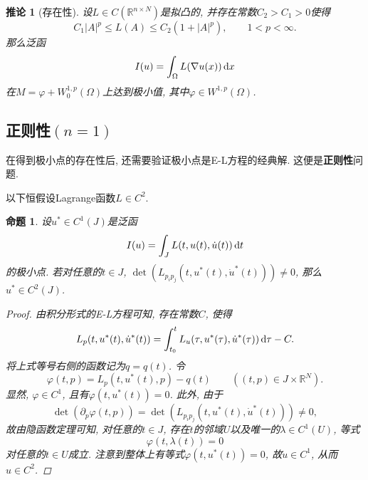 \documentclass[12pt,a4paper]{article}
\newtheorem{proposition}[theorem]{命题}
\newtheorem{corollary}[theorem]{推论}
\begin{document}
\begin{corollary}[存在性]
    设$L \in C(\mathbb{R}^{n \times N})$是拟凸的, 并存在常数$C_2 > C_1 > 0$使得 
    \begin{equation*}
        C_1|A|^p \leq L(A) \leq C_2(1 + |A|^p), \qquad 1 < p < \infty.
    \end{equation*}
    那么泛函 
    \begin{equation*}
        I(u) = \int_{\Omega}L(\nabla u(x)) \,{\rm d}x
    \end{equation*}
    在$M = \varphi + W_0^{1, p}(\Omega)$上达到极小值, 其中$\varphi \in W^{1, p}(\Omega)$.
\end{corollary}

\subsection{正则性\texorpdfstring{$(n = 1)$}{}}

在得到极小点的存在性后, 还需要验证极小点是E-L方程的经典解. 这便是\textbf{正则性}问题.

以下恒假设Lagrange函数$L \in C^2$.

\begin{proposition}
    设$u^* \in C^1(J)$是泛函 
    \begin{equation*}
        I(u) = \int_JL(t, u(t), \dot u(t)) \,{\rm d}t
    \end{equation*}
    的极小点. 若对任意的$t \in J$, $\det(L_{p_ip_j}(t, u^*(t), \dot u^*(t))) \neq 0$, 那么$u^* \in C^2(J)$.
    \begin{proof}
        由积分形式的E-L方程可知, 存在常数$C$, 使得 
        \begin{equation*}
            L_p(t, u^*(t), \dot u^*(t)) = \int_{t_0}^tL_u(\tau, u^*(\tau), \dot u^*(\tau)) \,{\rm d}\tau - C.
        \end{equation*} 
        将上式等号右侧的函数记为$q = q(t)$. 令
        \begin{equation*}
            \varphi(t, p) = L_p(t, u^*(t), p) - q(t) \qquad ((t, p) \in J \times \mathbb{R}^N).
        \end{equation*}
        显然, $\varphi \in C^1$, 且有$\varphi(t, u^*(t)) = 0$. 此外, 由于
        \begin{equation*}
            \det(\partial_p\varphi(t, p)) = \det(L_{p_ip_j}(t, u^*(t), \dot u^*(t))) \neq 0,
        \end{equation*} 
        故由隐函数定理可知, 对任意的$t \in J$, 存在$t$的邻域$U$以及唯一的$\lambda \in C^1(U)$, 等式 
        \begin{equation*}
            \varphi(t, \lambda(t)) = 0
        \end{equation*}
        对任意的$t \in U$成立. 注意到整体上有等式$\varphi(t, u^*(t)) = 0$, 故$\dot u \in C^1$, 从而$u \in C^2$. 
    \end{proof}
\end{proposition}
\end{document}
